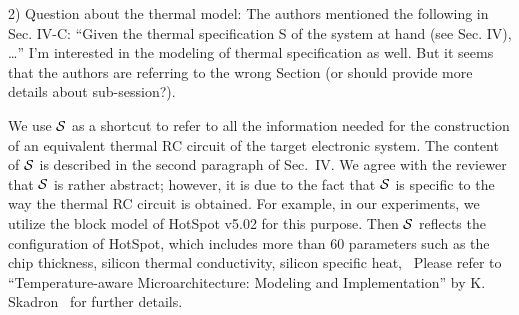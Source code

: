 \begin{reviewer}
2) Question about the thermal model: The authors mentioned the following in Sec. IV-C: ``Given the thermal specification S of the system at hand (see Sec. IV), \ldots'' I’m interested in the modeling of thermal specification as well. But it seems that the authors are referring to the wrong Section (or should provide more details about sub-session?).
\end{reviewer}
\begin{authors}
We use $\mathcal{S}$ as a shortcut to refer to all the information needed for the construction of an equivalent thermal RC circuit of the target electronic system.
The content of $\mathcal{S}$ is described in the second paragraph of Sec.~IV.
We agree with the reviewer that $\mathcal{S}$ is rather abstract; however, it is due to the fact that $\mathcal{S}$ is specific to the way the thermal RC circuit is obtained.
For example, in our experiments, we utilize the block model of HotSpot v5.02 for this purpose.
Then $\mathcal{S}$ reflects the configuration of HotSpot, which includes more than 60 parameters such as the chip thickness, silicon thermal conductivity, silicon specific heat, \etc\ Please refer to ``Temperature-aware Microarchitecture: Modeling and Implementation'' by K. Skadron \etal\ for further details.



\end{authors}

